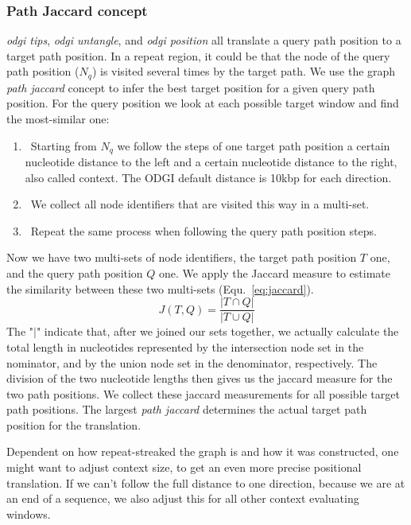 \documentclass{bioinfo}
\begin{document}
\subsubsection{Path Jaccard concept}
\label{sec:supp_path_jaccard}
\textit{odgi tips}, \textit{odgi untangle}, and \textit{odgi position} all translate a query path position to a target path position. In a repeat region, it could be that the node of the query path position ($N_q$) is visited several times by the target path. We use the graph \textit{path jaccard} concept to infer the best target position for a given query path position. For the query position we look at each possible target window and find the most-similar one: 
\begin{enumerate}
	\item~Starting from $N_q$ we follow the steps of one target path position a certain nucleotide distance to the left and a certain nucleotide distance to the right, also called context. The ODGI default distance is 10kbp for each direction.
	\item~We collect all node identifiers that are visited this way in a multi-set.
	\item~Repeat the same process when following the query path position steps.
\end{enumerate}
Now we have two multi-sets of node identifiers, the target path position $T$ one, and the query path position $Q$ one. We apply the Jaccard measure to estimate the similarity between these two multi-sets (Equ.~\ref{eq:jaccard}).
\begin{equation}
	J(T,Q)=\frac{|T\cap Q|}{|T\cup Q|}
	\label{eq:jaccard}
\end{equation}
The "$|$" indicate that, after we joined our sets together, we actually calculate the total length in nucleotides represented by the intersection node set in the nominator, and by the union node set in the denominator, respectively. The division of the two nucleotide lengths then gives us the jaccard measure for the two path positions.
We collect these jaccard measurements for all possible target path positions. The largest \textit{path jaccard} determines the actual target path position for the translation.

Dependent on how repeat-streaked the graph is and how it was constructed, one might want to adjust context size, to get an even more precise positional translation. If we can't follow the full distance to one direction, because we are at an end of a sequence, we also adjust this for all other context evaluating windows.
\end{document}
